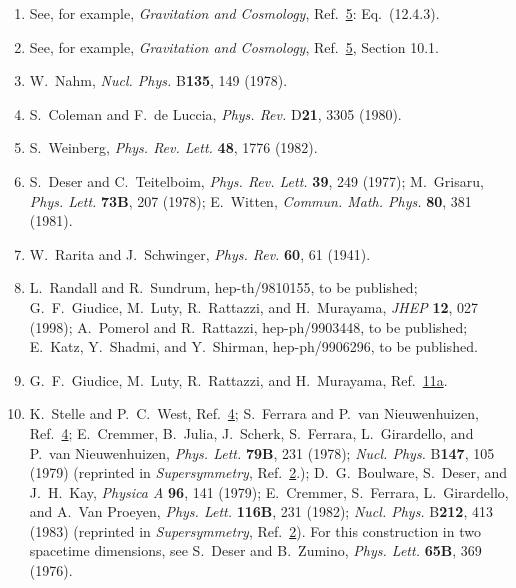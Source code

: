 \begin{enumerate}
  \item {}\label{ch31-ref-6}
  See, for example, \textit{Gravitation and Cosmology},
  Ref.~\hyperref[ch31-ref-5]{5}: Eq.~(12.4.3).

  \item {}\label{ch31-ref-7}
  See, for example, \textit{Gravitation and Cosmology},
  Ref.~\hyperref[ch31-ref-5]{5}, Section 10.1.

  \item[7a.] \label{ch31-ref-7a}
  W.~Nahm, \textit{Nucl. Phys.} B\textbf{135}, 149 (1978).

  \item {}\label{ch31-ref-8}
  S.~Coleman and F.~de Luccia, \textit{Phys. Rev.} D\textbf{21}, 3305
  (1980).

  \item {}\label{ch31-ref-9}
  S.~Weinberg, \textit{Phys. Rev. Lett.} \textbf{48}, 1776 (1982).

  \item {}\label{ch31-ref-10}
  S.~Deser and C.~Teitelboim, \textit{Phys. Rev. Lett.} \textbf{39},
  249 (1977); M.~Grisaru, \textit{Phys. Lett.} \textbf{73B}, 207
  (1978); E.~Witten, \textit{Commun. Math. Phys.} \textbf{80}, 381
  (1981).

  \item {}\label{ch31-ref-11}
  W.~Rarita and J.~Schwinger, \textit{Phys. Rev.} \textbf{60}, 61
  (1941).

  \item[11a.] \label{ch31-ref-11a}
  L.~Randall and R.~Sundrum, hep-th/9810155, to be published;
  G.~F.~Giudice, M.~Luty, R.~Rattazzi, and H.~Murayama,
  \textit{JHEP} \textbf{12}, 027 (1998); A.~Pomerol and R.~Rattazzi,
  hep-ph/9903448, to be published; E.~Katz, Y.~Shadmi, and Y.~Shirman,
  hep-ph/9906296, to be published.

  \item[11b.] \label{ch31-ref-11b}
  G.~F.~Giudice, M.~Luty, R.~Rattazzi, and H.~Murayama,
  Ref.~\hyperref[ch31-ref-11a]{11a}.

  \item {}\label{ch31-ref-12}
  K.~Stelle and P.~C.~West, Ref.~\hyperref[ch31-ref-4]{4};
  S.~Ferrara and P.~van Nieuwenhuizen,
  Ref.~\hyperref[ch31-ref-4]{4}; E.~Cremmer, B.~Julia, J.~Scherk,
  S.~Ferrara, L.~Girardello, and P.~van Nieuwenhuizen,
  \textit{Phys. Lett.} \textbf{79B}, 231 (1978);
  \textit{Nucl. Phys.} B\textbf{147}, 105 (1979) (reprinted in
  \textit{Supersymmetry}, Ref.~\hyperref[ch31-ref-2]{2}.);
  D.~G.~Boulware, S.~Deser, and J.~H.~Kay, \textit{Physica A}
  \textbf{96}, 141 (1979); E.~Cremmer, S.~Ferrara, L.~Girardello,
  and A.~Van Proeyen, \textit{Phys. Lett.} \textbf{116B}, 231 (1982);
  \textit{Nucl. Phys.} B\textbf{212}, 413 (1983) (reprinted in
  \textit{Supersymmetry}, Ref.~\hyperref[ch31-ref-2]{2}). For this
  construction in two spacetime dimensions, see S.~Deser and
  B.~Zumino, \textit{Phys. Lett.} \textbf{65B}, 369 (1976).


\end{enumerate}
